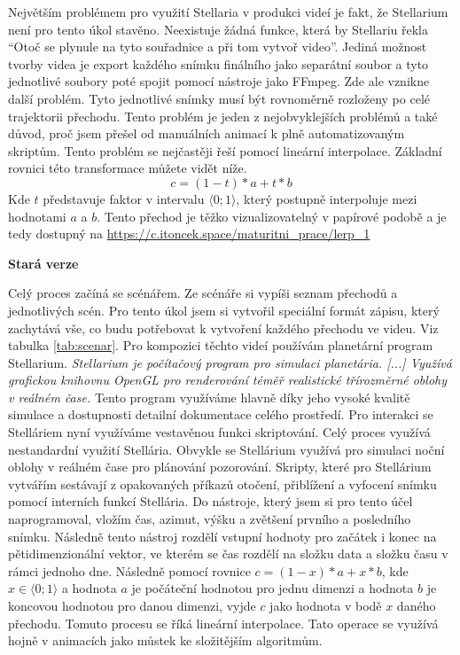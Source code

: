 \documentclass[12pt,a4paper,titlepage]{article}
\begin{document}
Největším problémem pro využití Stellaria v produkci videí je fakt, že Stellarium není pro tento úkol stavěno. Neexistuje žádná funkce, která by Stellariu řekla \enquote{Otoč se plynule na tyto souřadnice a při tom vytvoř video}. Jediná možnost tvorby videa je export každého snímku finálního jako separátní soubor a tyto jednotlivé soubory poté spojit pomocí nástroje jako FFmpeg. Zde ale vznikne další problém. Tyto jednotlivé snímky musí být rovnoměrně rozloženy po celé trajektorii přechodu. Tento problém je jeden z nejobvyklejších problémů a také důvod, proč jsem přešel od manuálních animací k plně automatizovaným skriptům. Tento problém se nejčastěji řeší pomocí lineární interpolace. Základní rovnici této transformace můžete vidět níže.
\[c = (1-t)*a + t * b\] 
Kde $t$ představuje faktor v intervalu $\langle0;1\rangle$, který postupně interpoluje mezi hodnotami $a$ a $b$. Tento přechod je těžko vizualizovatelný v papírové podobě a je tedy dostupný na \url{https://c.itoncek.space/maturitni_prace/lerp_1}

\textbf{Stará verze}

Celý proces začíná se scénářem. Ze scénáře si vypíši seznam přechodů a jednotlivých scén. Pro tento úkol jsem si vytvořil speciální formát zápisu, který zachytává vše, co budu potřebovat k vytvoření každého přechodu ve videu. Viz tabulka \ref{tab:scenar}. 
Pro kompozici těchto videí používám planetární program Stellarium. \textit{Stellarium je počítačový program pro simulaci planetária. [...] Využívá grafickou knihovnu OpenGL pro renderování téměř realistické třírozměrné oblohy v reálném čase.}  Tento program využíváme hlavně díky jeho vysoké kvalitě simulace a dostupnosti detailní dokumentace celého prostředí. Pro interakci se Stelláriem nyní využíváme vestavěnou funkci skriptování. Celý proces využívá nestandardní využití Stellária. Obvykle se Stellárium využívá pro simulaci noční oblohy v reálném čase pro plánování pozorování. Skripty, které pro Stellárium vytvářím sestávají z opakovaných příkazů otočení, přiblížení a vyfocení snímku pomocí interních funkcí Stellária. Do nástroje, který jsem si pro tento účel naprogramoval, vložím čas, azimut, výšku a zvětšení prvního a posledního snímku. Následně tento nástroj rozdělí vstupní hodnoty pro začátek i konec na pětidimenzionální vektor, ve kterém se čas rozdělí na složku data a složku času v rámci jednoho dne. Následně pomocí rovnice $c = (1-x)*a + x * b$, kde $x \in \langle0;1\rangle$ a hodnota $a$ je počáteční hodnotou pro jednu dimenzi a hodnota $b$ je koncovou hodnotou pro danou dimenzi, vyjde $c$ jako hodnota v bodě $x$ daného přechodu. Tomuto procesu se říká lineární interpolace. Tato operace se využívá hojně v animacích jako můstek ke složitějším algoritmům. 
\end{document}
